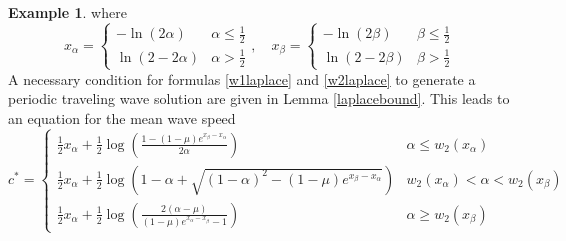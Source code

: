 \documentclass[11pt]{article}
\theoremstyle{definition}
\newtheorem{ex}[thm]{Example}
\numberwithin{equation}{section}
\numberwithin{thm}{section}
\renewcommand{\a}{\alpha}
\renewcommand{\b}{\beta}
\newcommand{\m}{\mu}
\begin{document}
\begin{ex}
where
\begin{equation}
x_\a = \begin{cases} -\ln(2\a) & \a\leq \frac{1}{2} \\ \ln(2-2\a) & \a > \frac{1}{2} \end{cases}, \quad
x_\b = \begin{cases} -\ln(2\b) & \b\leq \frac{1}{2} \\ \ln(2-2\b) & \b > \frac{1}{2} \end{cases} 
\end{equation}
A necessary condition for formulas \eqref{w1laplace} and \eqref{w2laplace} to generate a periodic traveling wave solution are given in Lemma \ref{laplacebound}. This leads to an equation for the mean wave speed
\begin{equation}
c^* = \begin{cases}
\frac{1}{2}x_\a  + \frac{1}{2}\log \left( \frac{1 - (1-\m) e^{x_\b-x_\a}}{2\a} \right) & \a \leq w_2(x_\a) \\
\frac{1}{2}x_\a + \frac{1}{2} \log \left( 1-\a + \sqrt{(1-\a)^2 - (1-\mu) e^{x_\b-x_\a}} \right) & w_2(x_\a) < \a < w_2(x_\b) \\
\frac{1}{2}x_\a + \frac{1}{2} \log \left( \frac{2(\a-\m)}{(1-\m)e^{x_\a-x_\b}-1} \right) & \a \geq w_2(x_\b)
\end{cases} 
\end{equation}
%
%
\newcommand{\Conecaseone}{\b(1-\m)-\a}
\newcommand{\Conecasetwo}{\frac{1-\m-4\a(1-\b)}{4(1-\b)}}
\newcommand{\Conecasethree}{- \frac{1-\b+\m(1-\a)}{4(1-\a)(1-\b)} }
%

\end{ex}
\end{document}
